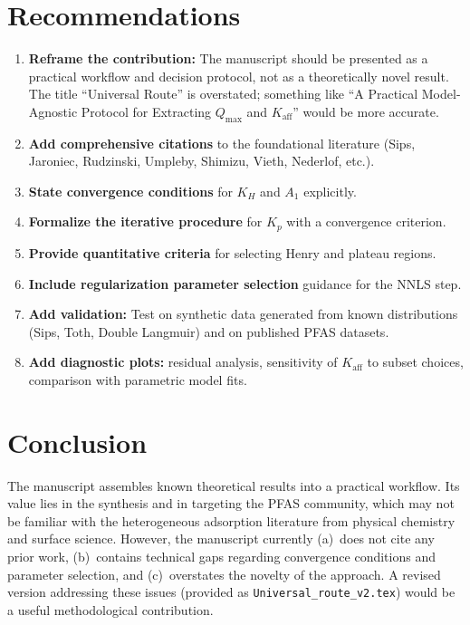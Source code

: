 \documentclass[12pt]{article}
\begin{document}
\section{Recommendations}

\begin{enumerate}
  \item \textbf{Reframe the contribution:} The manuscript should be
        presented as a practical workflow and decision protocol, not as
        a theoretically novel result.  The title ``Universal Route'' is
        overstated; something like ``A Practical Model-Agnostic Protocol
        for Extracting $Q_{\max}$ and $K_{\mathrm{aff}}$'' would be more
        accurate.
  \item \textbf{Add comprehensive citations} to the foundational
        literature (Sips, Jaroniec, Rudzinski, Umpleby, Shimizu, Vieth,
        Nederlof, etc.).
  \item \textbf{State convergence conditions} for $K_H$ and $A_1$
        explicitly.
  \item \textbf{Formalize the iterative procedure} for $K_p$ with a
        convergence criterion.
  \item \textbf{Provide quantitative criteria} for selecting Henry and
        plateau regions.
  \item \textbf{Include regularization parameter selection} guidance for
        the NNLS step.
  \item \textbf{Add validation:} Test on synthetic data generated from
        known distributions (Sips, Toth, Double Langmuir) and on
        published PFAS datasets.
  \item \textbf{Add diagnostic plots:} residual analysis, sensitivity
        of $K_{\mathrm{aff}}$ to subset choices, comparison with
        parametric model fits.
\end{enumerate}

\section{Conclusion}

The manuscript assembles known theoretical results into a practical
workflow.  Its value lies in the synthesis and in targeting the PFAS
community, which may not be familiar with the heterogeneous adsorption
literature from physical chemistry and surface science.  However, the
manuscript currently (a)~does not cite any prior work, (b)~contains
technical gaps regarding convergence conditions and parameter selection,
and (c)~overstates the novelty of the approach.  A revised version
addressing these issues (provided as \texttt{Universal\_route\_v2.tex})
would be a useful methodological contribution.
\end{document}
